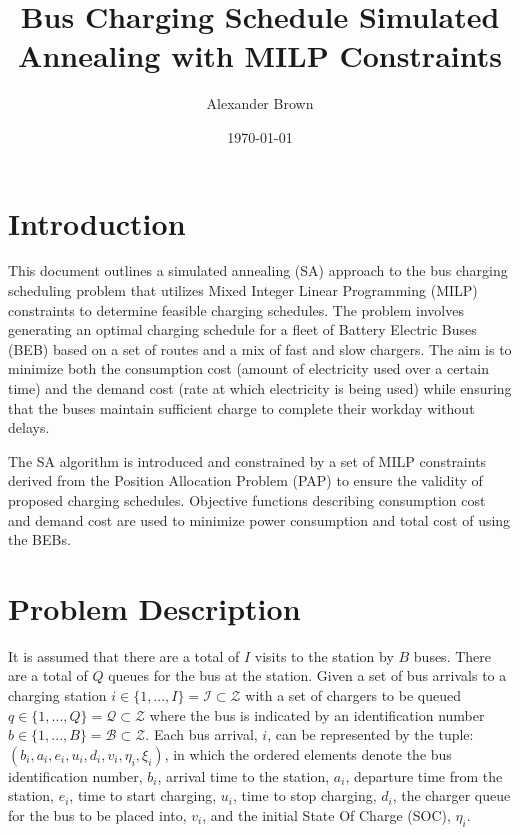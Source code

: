 \documentclass[11pt,a4paper,final]{article}
\author{Alexander Brown}
\date{\today}
\title{Bus Charging Schedule Simulated Annealing with MILP Constraints}
\newcommand{\visit}{(b_i, a_i, e_i, u_i, d_i, v_i, \eta_i, \xi_i)}
\newcommand{\Iset}{\mathcal{I}}             %
\newcommand{\Bset}{\mathcal{B}}             %
\newcommand{\Qset}{\mathcal{Q}}             %
\begin{document}
\maketitle
\tableofcontents

\parskip 3mm                                %
\let\ref\autoref                            %

\section{Introduction}
\label{sec:introduction}
This document outlines a simulated annealing (SA) approach to the bus charging scheduling problem that utilizes Mixed
Integer Linear Programming (MILP) constraints to determine feasible charging schedules. The problem involves generating
an optimal charging schedule for a fleet of Battery Electric Buses (BEB) based on a set of routes and a mix of fast and
slow chargers. The aim is to minimize both the consumption cost (amount of electricity used over a certain time) and the
demand cost (rate at which electricity is being used) while ensuring that the buses maintain sufficient charge to
complete their workday without delays.

The SA algorithm is introduced and constrained by a set of MILP constraints derived from the Position Allocation Problem
(PAP) to ensure the validity of proposed charging schedules. Objective functions describing consumption cost and demand
cost are used to minimize power consumption and total cost of using the BEBs.
\section{Problem Description}
\label{sec:problem-description}
It is assumed that there are a total of \(I\) visits to the station by \(B\) buses. There are a total of \(Q\) queues for the
bus at the station. Given a set of bus arrivals to a charging station \(i \in \{1,..., I\} = \Iset \subset \mathcal{Z}\) with a set of
chargers to be queued \(q \in \{1,..., Q\} = \Qset \subset \mathcal{Z}\) where the bus is indicated by an identification number \(b \in
\{1,..., B\} = \Bset \subset \mathcal{Z}\). Each bus arrival, \(i\), can be represented by the tuple: \(\visit\), in which the ordered
elements denote the bus identification number, \(b_i\), arrival time to the station, \(a_i\), departure time from the
station, \(e_i\), time to start charging, \(u_i\), time to stop charging, \(d_i\), the charger queue for the bus to be placed
into, \(v_i\), and the initial State Of Charge (SOC), \(\eta_i\).
\end{document}

